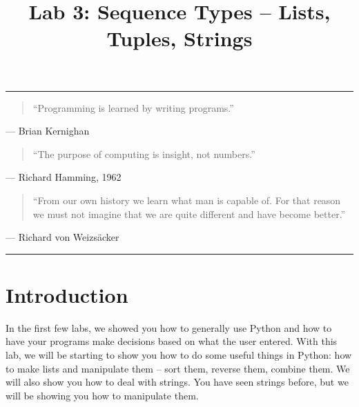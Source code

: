 \documentclass[11pt]{cselabheader}
\title{Lab 3: Sequence Types -- Lists, Tuples, Strings}
\begin{document}
\maketitle
{}
\hrule

\begin{quotation}
``Programming is learned by writing programs.''
\end{quotation}
\begin{flushright}
--- Brian Kernighan
\end{flushright}

\begin{quotation}
``The purpose of computing is insight, not numbers.''
\end{quotation}
\begin{flushright}
--- Richard Hamming, 1962
\end{flushright}

\begin{quotation}
  ``From our own history we learn what man is capable of. For that reason we
  must not imagine that we are quite different and have become better.''
\end{quotation}
\begin{flushright}
  --- Richard von Weizs\"{a}cker
\end{flushright}
\hrule

\section{Introduction}

In the first few labs, we showed you how to generally use Python and how to
have your programs make decisions based on what the user entered. With this
lab, we will be starting to show you how to do some useful things in Python:
how to make lists and manipulate them -- sort them, reverse them, combine them.
We will also show you how to deal with strings. You have seen strings before,
but we will be showing you how to manipulate them.

\pagebreak

\tableofcontents
\end{document}
